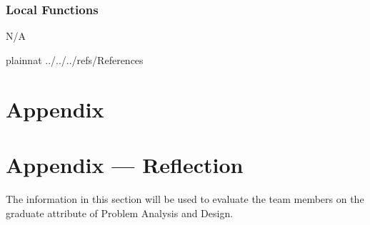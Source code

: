 \documentclass[12pt, titlepage]{article}
\begin{document}
\subsubsection{Local Functions}
N/A

\newpage

 {plainnat}
 {../../../refs/References}

\newpage

\section{Appendix} \label{Appendix}


\newpage{}

\section*{Appendix --- Reflection}


The information in this section will be used to evaluate the team members on the
graduate attribute of Problem Analysis and Design.


\end{document}
